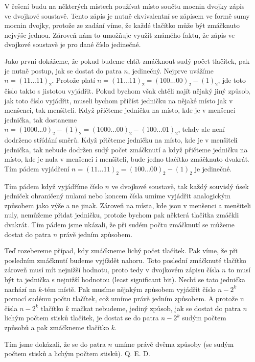 \documentclass{fkssolpub}
\author{Ondřej Sedláček}
\begin{document}
V řešení budu na některých místech používat místo součtu mocnin dvojky zápis ve dvojkové soustavě. Tento zápis je nutně ekvivalentní se zápisem ve formě sumy mocnin dvojky, protože ze zadání víme, že každé tlačítko může být zmáčknuto nejvýše jednou. Zároveň nám to umožňuje využít známého faktu, že zápis ve dvojkové soustavě je pro dané číslo jedinečné.

Jako první dokážeme, že pokud budeme chtít zmáčknout sudý počet tlačítek, pak je nutně postup, jak se dostat do patra $n$, jedinečný. Nejprve uvážíme $n = (11...11)_2$. Protože platí $n = (11...11)_2 = (100...00)_2 - (1)_2$, jde toto číslo takto s jistotou vyjádřit. Pokud bychom však chtěli najít nějaký jiný způsob, jak toto číslo vyjádřit, museli bychom přičíst jedničku na nějaké místo jak v menšenci, tak menšiteli. Když přičteme jedničku na místo, kde je v menšenci jednička, tak dostaneme $n = (1000...0)_2 - (1)_2 = (1000...00)_2 - (100...01)_2$, tehdy ale není dodrženo střídání směrů. Když přičteme jedničku na místo, kde je v menšiteli jednička, tak nebude dodržen sudý počet zmáčknutí a když přičteme jedničku na místo, kde je nula v menšenci i menšiteli, bude jedno tlačítko zmáčknuto dvakrát. Tím pádem vyjádření $n = (11...11)_2 = (100...00)_2 - (1)_2$ je jedinečné.

Tím pádem když vyjádříme číslo $n$ ve dvojkové soustavě, tak každý souvislý úsek jedniček ohraničený nulami nebo koncem čísla umíme vyjádřit analogickým způsobem jako výše a ne jinak. Zároveň na místa, kde jsou v menšenci a menšiteli nuly, nemůžeme přidat jedničku, protože bychom pak některá tlačítka zmáčkli dvakrát. Tím pádem jsme ukázali, že při sudém počtu zmáčknutí se můžeme dostat do patra $n$ právě jedním způsobem.

Teď rozebereme případ, kdy zmáčkneme lichý počet tlačítek. Pak víme, že při posledním zmáčknutí budeme vyjíždět nahoru. Toto poslední zmáčknuté tlačítko zároveň musí mít nejnižší hodnotu, proto tedy v dvojkovém zápisu čísla $n$ to musí být ta jednička s nejnižší hodnotou (least significant bit). Nechť se tato jednička nachází na $k$-tém místě. Pak musíme nějakým způsobem vyjádřit číslo $n - 2^k$ pomocí sudému počtu tlačítek, což umíme právě jedním způsobem. A protože u čísla $n - 2^k$ tlačítko $k$ mačkat nebudeme, jediný způsob, jak se dostat do patra $n$ lichým počtem stisků tlačítek, je dostat se do patra $n - 2^k$ sudým počtem způsobů a pak zmáčkneme tlačítko $k$.

Tím jsme dokázali, že se do patra $n$ umíme právě dvěma způsoby (se sudým počtem stisků a lichým počtem stisků). Q. E. D.
\end{document}
